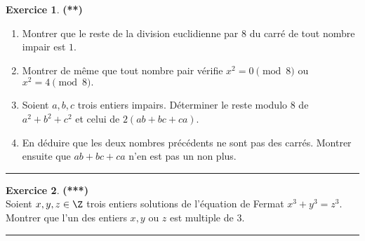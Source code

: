 \documentclass[a4paper,11pt]{article}
\theoremstyle{definition}
\newtheorem{exo}{Exercice} %
\begin{document}
\begin{minipage}{1\linewidth}
\begin{minipage}[t]{0.48\linewidth}
\begin{exo}\textbf{(**)}\quad\\[0.15cm]
	\begin{enumerate}
		\item Montrer que le reste de la division euclidienne par $8$ du carr\'{e} de tout
		nombre impair est $1$.
		\item Montrer de m\^{e}me que tout nombre pair v\'{e}rifie $x^{2}=0 \pmod{8} $ ou
		$x^{2}=4 \pmod{8}.$
		\item Soient $a,b,c$ trois entiers impairs. D\'{e}terminer le reste modulo $8$ de
		$a^{2}+b^{2}+c^{2}$ et celui de $2(ab+bc+ca).$
		\item En d\'{e}duire que les deux nombres précédents ne sont pas des carr\'{e}s. Montrer ensuite que
		$ab+bc+ca$ n'en est pas un non plus.
	\end{enumerate}
	\centering
	\rule{1\linewidth}{0.6pt}
\end{exo}


\begin{exo}\textbf{(***)}\quad\\[0.15cm]
	Soient $x, y, z \in \Z$ trois entiers solutions de l'équation de Fermat $x^3 + y^3 = z^3 $. Montrer que l'un des entiers $x, y$ ou $z$ est
	multiple de $3$.

	
	
	\centering
	\rule{1\linewidth}{0.6pt}
\end{exo}



\end{minipage}
\end{minipage}
\end{document}
